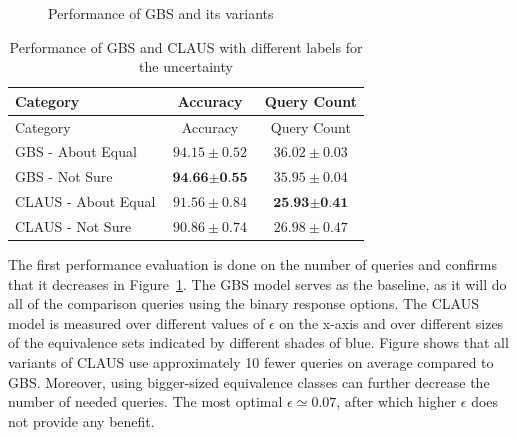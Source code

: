 \documentclass[
  letterpaper,
  numbers=noenddot,
  DIV=11,
  oneside]{scrreprt}
\theoremstyle{remark}
\begin{document}
\begin{figure}


\caption{\label{fig-claus_num}Performance of GBS and its variants}

\end{figure}%

\begin{longtable}[]{@{}lcc@{}}
\caption{Performance of GBS and CLAUS with different labels for the
uncertainty}\label{tbl-claus_tab}\tabularnewline
\toprule\noalign{}
Category & Accuracy & Query Count \\
\midrule\noalign{}
\endfirsthead
\toprule\noalign{}
Category & Accuracy & Query Count \\
\midrule\noalign{}
\endhead
\bottomrule\noalign{}
\endlastfoot
GBS - About Equal & \(94.15 \pm 0.52\) & \(36.02 \pm 0.03\) \\
GBS - Not Sure & \(\textbf{94.66} \pm \textbf{0.55}\) &
\(35.95 \pm 0.04\) \\
CLAUS - About Equal & \(91.56 \pm 0.84\) &
\(\textbf{25.93} \pm \textbf{0.41}\) \\
CLAUS - Not Sure & \(90.86 \pm 0.74\) & \(26.98 \pm 0.47\) \\
\end{longtable}

The first performance evaluation is done on the number of queries and
confirms that it decreases in Figure~\ref{fig-claus_num}. The GBS model
serves as the baseline, as it will do all of the comparison queries
using the binary response options. The CLAUS model is measured over
different values of \(\epsilon\) on the x-axis and over different sizes
of the equivalence sets indicated by different shades of blue. Figure
shows that all variants of CLAUS use approximately 10 fewer queries on
average compared to GBS. Moreover, using bigger-sized equivalence
classes can further decrease the number of needed queries. The most
optimal \(\epsilon \simeq 0.07\), after which higher \(\epsilon\) does
not provide any benefit.
\end{document}
